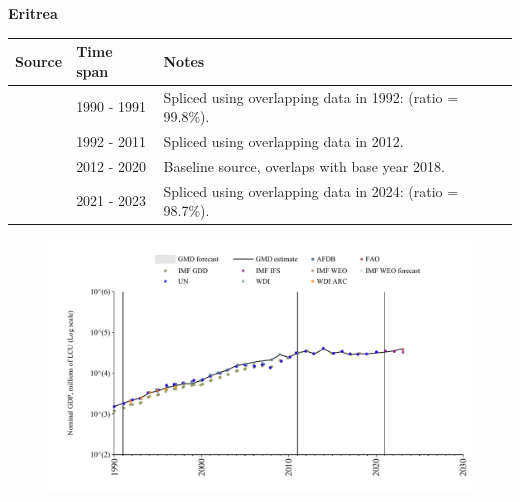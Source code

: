 \documentclass[12pt,a4paper,landscape]{article}
\begin{document}
\begin{adjustbox}{max totalsize={\paperwidth}{\paperheight},center}
\begin{minipage}[t][\textheight][t]{\textwidth}
\vspace*{0.5cm}
{}
\begin{center}
{\Large\bfseries Eritrea}
\end{center}
\vspace{0.5cm}
\begin{table}[H]
\centering
\small
\begin{tabular}{|l|l|l|}
\hline
\textbf{Source} & \textbf{Time span} & \textbf{Notes} \\
\hline
\rowcolor{white}\cite{UN}& 1990 - 1991 &Spliced using overlapping data in 1992: (ratio = 99.8\%).\\
\rowcolor{lightgray}\cite{WDI}& 1992 - 2011 &Spliced using overlapping data in 2012.\\
\rowcolor{white}\cite{UN}& 2012 - 2020 &Baseline source, overlaps with base year 2018.\\
\rowcolor{lightgray}\cite{FAO}& 2021 - 2023 &Spliced using overlapping data in 2024: (ratio = 98.7\%).\\
\hline
\end{tabular}
\end{table}
\begin{figure}[H]
\centering
\includegraphics[width=\textwidth,height=0.6\textheight,keepaspectratio]{graphs/ERI_nGDP.pdf}
\end{figure}
\end{minipage}
\end{adjustbox}
\end{document}

